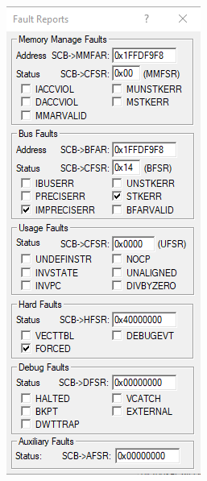 \begin{figure}[h]
    \centering
    \begin{subfigure}[b]{0.3\textwidth}
        \centering
        \includegraphics[width=\textwidth]{figures/keil_error_5A000.png}

\end{subfigure}
\end{figure}

